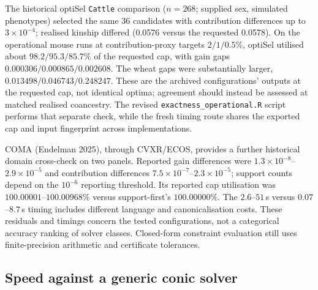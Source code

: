 \documentclass[11pt]{article}
\begin{document}
The historical optiSel \texttt{Cattle} comparison ($n=268$; supplied sex, simulated phenotypes) selected the same 36 candidates with contribution differences up to $3\times10^{-4}$; realised kinship differed (0.0576 versus the requested 0.0578). On the operational mouse runs at contribution-proxy targets $2/1/0.5\%$, optiSel utilised about $98.2/95.3/85.7\%$ of the requested cap, with gain gaps $0.000306/0.000865/0.002608$. The wheat gaps were substantially larger, $0.013498/0.046743/0.248247$. These are the archived configurations' outputs at the requested cap, not identical optima; agreement should instead be assessed at matched realised coancestry. The revised \texttt{exactness\_operational.R} script performs that separate check, while the fresh timing route shares the exported cap and input fingerprint across implementations.

COMA (Endelman 2025), through CVXR/ECOS, provides a further historical domain cross-check on two panels. Reported gain differences were $1.3\times10^{-8}$--$2.9\times10^{-5}$ and contribution differences $7.5\times10^{-7}$--$2.3\times10^{-5}$; support counts depend on the $10^{-6}$ reporting threshold. Its reported cap utilisation was $100.00001$--$100.00968\%$ versus support-first's $100.00000\%$. The $2.6$--$51$\,s versus $0.07$--$8.7$\,s timing includes different language and canonicalisation costs. These residuals and timings concern the tested configurations, not a categorical accuracy ranking of solver classes. Closed-form constraint evaluation still uses finite-precision arithmetic and certificate tolerances.

\subsection{Speed against a generic conic solver}\label{sec:clarabel}
\end{document}
